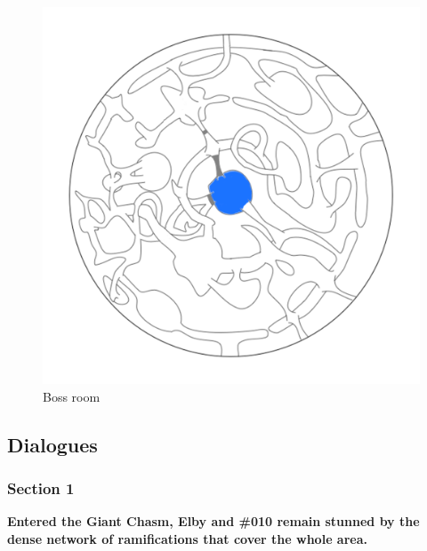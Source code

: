 \begin{figure}[H]
	\centering
	\includegraphics[width=0.7\linewidth]{images/map/2D_map_section_04.png}
	\caption*{Boss room}
\end{figure}
\newpage


\subsection{Dialogues}

\subsubsection{Section 1}
\vspace*{0.3cm}

	\textbf{Entered the Giant Chasm, Elby and \#010 remain stunned by the dense network of ramifications that cover the whole area.}

